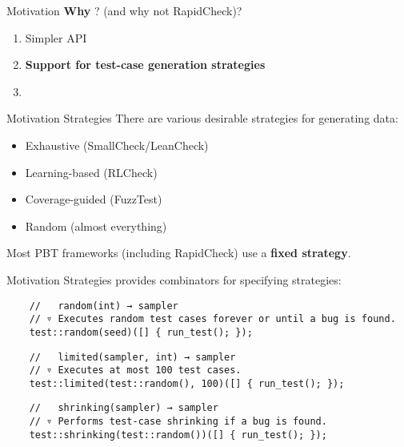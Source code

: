 \begin{frame}{\halcheck{} \textemdash{} Motivation}
  \textbf{Why} \halcheck{}? (and why not RapidCheck)?

  \begin{enumerate}
    \item Simpler API
    \item \textbf{Support for test-case generation strategies}
    \item
  \end{enumerate}
\end{frame}

\begin{frame}{\halcheck{} \textemdash{} Motivation \textemdash{} Strategies}
  There are various desirable strategies for generating data:
  \begin{itemize}
    \item Exhaustive (SmallCheck/LeanCheck)
    \item Learning-based (RLCheck)
    \item Coverage-guided (FuzzTest)
    \item Random (almost everything)
  \end{itemize}

  Most PBT frameworks (including RapidCheck) use a \textbf{fixed strategy}.
\end{frame}

\begin{frame}[fragile]{\halcheck{} \textemdash{} Motivation \textemdash{} Strategies}
  \halcheck{} provides combinators for specifying strategies:

  \begin{verbatim}
    //   random(int) → sampler
    // ▿ Executes random test cases forever or until a bug is found.
    test::random(seed)([] { run_test(); });
  \end{verbatim}

  \pause{}

  \begin{verbatim}
    //   limited(sampler, int) → sampler
    // ▿ Executes at most 100 test cases.
    test::limited(test::random(), 100)([] { run_test(); });
  \end{verbatim}

  \pause{}

  \begin{verbatim}
    //   shrinking(sampler) → sampler
    // ▿ Performs test-case shrinking if a bug is found.
    test::shrinking(test::random())([] { run_test(); });
  \end{verbatim}
\end{frame}

